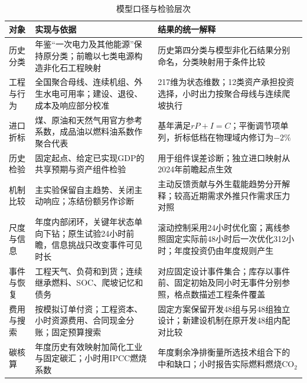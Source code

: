 
\begin{table}[!htbp]\centering\caption{模型口径与检验层次}\label{tab:scope}
\begin{tabularx}{\linewidth}{p{.15\linewidth}XX}\toprule
对象 & 实现与依据 & 结果的统一解释\\\midrule
历史分类 & 年鉴“一次电力及其他能源”保持原分类；前瞻以七类电源构造非化石工程映射 & 历史第四分类与模型非化石结果分别命名，分类映射用于条件比较\\
工程与行为 & 全国聚合母线、连续机组、外生水电可用率；建设、退役、成本及响应部分校准 & 217维为状态维数；12类资产承担投资选择，小时出力按聚合母线与连续爬坡执行\\
进口折标 & 煤、原油和天然气用官方参考系数，成品油以燃料油系数作聚合代表 & 基年满足$rP+I=C$；平衡调节项单列，折标低档在物理域内修订为$-2\%$\\
历史检验 & 固定起点、给定已实现GDP的共享预期与资产组件检验 & 用于组件误差诊断；独立进口映射从2024年前瞻起点生效\\
机制比较 & 主实验保留自主趋势、关闭主动响应；冻结份额另作诊断 & 主动反馈贡献与外生载能趋势分开解释；较高近期需求外推只作需求压力对照\\
尺度与信息 & 年度内部闭环，关键年状态单向下钻；原生试验24小时前瞻，信息挑战只改变事件可见时长 & 滚动控制采用24小时优化窗；离线参照固定实际前48小时后一次优化312小时；年度投资仍由年度规则产生\\
事件与恢复 & 工程天气、负荷和到货；连续继承燃料、SOC、爬坡记忆和债务 & 对应固定设计事件集合；库存以事件前、固定初始及同小时无事件分别参照，格点数描述工程条件覆盖\\
费用与搜索 & 按模拟订单付资；工程资本、小时资源费用、合同现金分账；固定预算搜索 & 固定方案保留开发48组与另48组独立设计；新建设机制在原开发48组内配对比较\\
碳核算 & 年度历史有效映射加简化工业与固定碳汇；小时用IPCC燃烧系数 & 年度剩余净排衡量所选技术组合下的中和缺口；小时报告实际燃料燃烧CO$_2$\\
\bottomrule\end{tabularx}\end{table}\FloatBarrier
